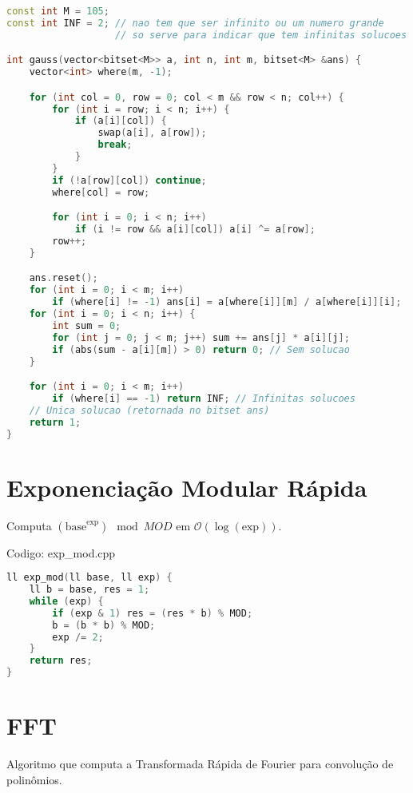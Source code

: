 \documentclass[10pt, a4paper, oneside]{book}
\begin{document}
\begin{lstlisting}[language=C++]
const int M = 105;
const int INF = 2; // nao tem que ser infinito ou um numero grande
                   // so serve para indicar que tem infinitas solucoes

int gauss(vector<bitset<M>> a, int n, int m, bitset<M> &ans) {
    vector<int> where(m, -1);

    for (int col = 0, row = 0; col < m && row < n; col++) {
        for (int i = row; i < n; i++) {
            if (a[i][col]) {
                swap(a[i], a[row]);
                break;
            }
        }
        if (!a[row][col]) continue;
        where[col] = row;

        for (int i = 0; i < n; i++)
            if (i != row && a[i][col]) a[i] ^= a[row];
        row++;
    }

    ans.reset();
    for (int i = 0; i < m; i++)
        if (where[i] != -1) ans[i] = a[where[i]][m] / a[where[i]][i];
    for (int i = 0; i < n; i++) {
        int sum = 0;
        for (int j = 0; j < m; j++) sum += ans[j] * a[i][j];
        if (abs(sum - a[i][m]) > 0) return 0; // Sem solucao
    }

    for (int i = 0; i < m; i++)
        if (where[i] == -1) return INF; // Infinitas solucoes
    // Unica solucao (retornada no bitset ans)
    return 1;
}
\end{lstlisting}
\hfill

\section{Exponenciação Modular Rápida}


Computa $(\text{base} ^ \text{exp}) \mod MOD$ em $\mathcal{O}(\log(\text{exp}))$.
\hfill

Codigo: exp\_mod.cpp

\begin{lstlisting}[language=C++]
ll exp_mod(ll base, ll exp) {
    ll b = base, res = 1;
    while (exp) {
        if (exp & 1) res = (res * b) % MOD;
        b = (b * b) % MOD;
        exp /= 2;
    }
    return res;
}
\end{lstlisting}
\hfill

\section{FFT}


Algoritmo que computa a Transformada Rápida de Fourier para convolução de polinômios.
\end{document}
